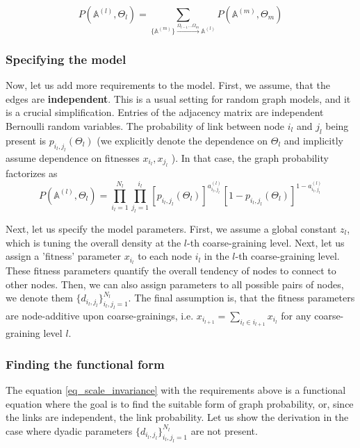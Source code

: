 \begin{equation}
    P(\mathbb{A}^{(l)}, \Theta_l) = \sum_{\{\mathbb{A}^{(m)}\} \xrightarrow{\Omega_{l-1}\dots\Omega_m} \mathbb{A}^{(l)}} P(\mathbb{A}^{(m)}, \Theta_m)
\label{eq_scale_invariance}
\end{equation}

\subsubsection{Specifying the model}
Now, let us add more requirements to the model. First, we assume, that the edges are \textbf{independent}.  This is a usual setting for random graph models, and it is a crucial simplification. Entries of the adjacency matrix are independent Bernoulli random variables. The probability of link between node $i_l$ and $j_l$ being present is $p_{i_l,j_l}(\Theta_l)$ (we explicitly denote the dependence on $\Theta_l$ and implicitly assume dependence on fitnesses $x_{i_l}, x_{j_l}$ ). In that case, the graph probability factorizes as
\begin{equation}
    P(\mathbb{A}^{(l)}, \Theta_l) = \prod_{i_l=1}^{N_l}\prod_{j_l=1}^{i_l} [p_{i_l,j_l}(\Theta_l)]^{a_{i_l,j_l}^{(l)}}[1 - p_{i_l,j_l}(\Theta_l)]^{1 - a_{i_l,j_l}^{(l)}}
\end{equation}

Next, let us specify the model parameters. First, we assume a global constant $z_l$, which is tuning the overall density at the $l$-th coarse-graining level. Next, let us assign a 'fitness' parameter $x_{i_l}$ to each node $i_l$ in the $l$-th coarse-graining level. These fitness parameters quantify the overall tendency of nodes to connect to other nodes. Then, we can also assign parameters to all possible pairs of nodes, we denote them $\{d_{i_l,j_l}\}_{i_l,j_l=1}^{N_l}$. The final assumption is, that the fitness parameters are node-additive upon coarse-grainings, i.e. $x_{i_{l+1}} = \sum_{i_l \in i_{l+1}} x_{i_l}$ for any coarse-graining level $l$.

\subsubsection{Finding the functional form}
The equation \ref{eq_scale_invariance} with the requirements above is a functional equation where the goal is to find the suitable form of graph probability, or, since the links are independent, the link probability. Let us show the derivation in the case where 
dyadic parameters $\{d_{i_l,j_l}\}_{i_l,j_l=1}^{N_l}$ are not present. 

